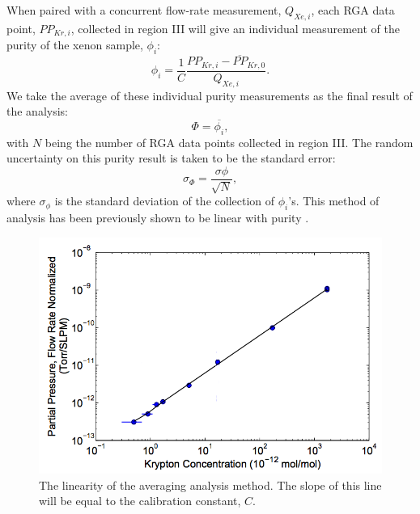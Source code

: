 When paired with a concurrent flow-rate measurement, $Q_{Xe,i}$, each RGA data point, $PP_{Kr,i}$, collected in region III will give an individual measurement of the purity of the xenon sample, $\phi_i$:
\begin{equation}
\phi_i=\frac{1}{C}\frac{PP_{Kr,i}-\overline{PP}_{Kr,0}}{Q_{Xe,i}}.
\label{eq:single_analysis}
\end{equation}
We take the average of these individual purity measurements as the final result of the analysis:
\begin{equation}
\Phi=\overline{\phi_i},
\label{eq:average_analysis}
\end{equation}
with $N$ being the number of RGA data points collected in region III. The random uncertainty on this purity result is taken to be the standard error:
\begin{equation}
\sigma_{\Phi}=\frac{\sigma{\phi}}{\sqrt{N}},
\label{eq:average_error}
\end{equation}
where $\sigma_{\phi}$ is the standard deviation of the collection of $\phi_i$'s. This method of analysis has been previously shown to be linear with purity \cite{sampling_doug,sampling_dm,sampling_EXO}.
\begin{figure}[h!]
  \includegraphics[width=\linewidth]{Figures/Lin_avg_Attila.png}
  \caption{The linearity of the averaging analysis method. The slope of this line will be equal to the calibration constant, $C$\cite{sampling_dm}. }
  \label{fig:linplot_attila}
\end{figure}

